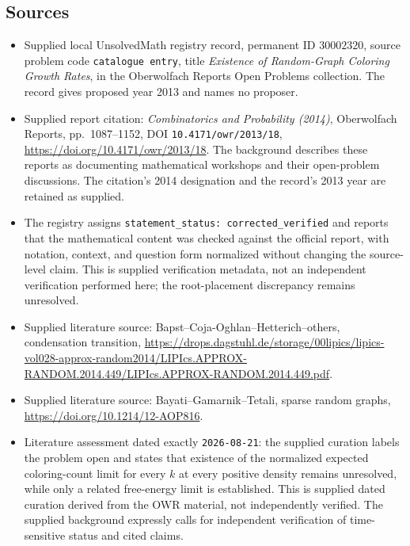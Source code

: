 \documentclass[11pt]{article}
\begin{document}
\subsection{Sources}
\begin{itemize}
\item Supplied local UnsolvedMath registry record, permanent ID \(30002320\), source problem code \texttt{catalogue entry}, title \emph{Existence of Random-Graph Coloring Growth Rates}, in the Oberwolfach Reports Open Problems collection. The record gives proposed year 2013 and names no proposer.
\item Supplied report citation: \emph{Combinatorics and Probability (2014)}, Oberwolfach Reports, pp.\ 1087--1152, DOI \texttt{10.4171/owr/2013/18}, \url{https://doi.org/10.4171/owr/2013/18}. The background describes these reports as documenting mathematical workshops and their open-problem discussions. The citation's 2014 designation and the record's 2013 year are retained as supplied.
\item The registry assigns \texttt{statement\_status: corrected\_verified} and reports that the mathematical content was checked against the official report, with notation, context, and question form normalized without changing the source-level claim. This is supplied verification metadata, not an independent verification performed here; the root-placement discrepancy remains unresolved.
\item Supplied literature source: Bapst--Coja-Oghlan--Hetterich--others, condensation transition, \url{https://drops.dagstuhl.de/storage/00lipics/lipics-vol028-approx-random2014/LIPIcs.APPROX-RANDOM.2014.449/LIPIcs.APPROX-RANDOM.2014.449.pdf}.
\item Supplied literature source: Bayati--Gamarnik--Tetali, sparse random graphs, \url{https://doi.org/10.1214/12-AOP816}.
\item Literature assessment dated exactly \texttt{2026-08-21}: the supplied curation labels the problem open and states that existence of the normalized expected coloring-count limit for every \(k\) at every positive density remains unresolved, while only a related free-energy limit is established. This is supplied dated curation derived from the OWR material, not independently verified. The supplied background expressly calls for independent verification of time-sensitive status and cited claims.
\end{itemize}
\end{document}

